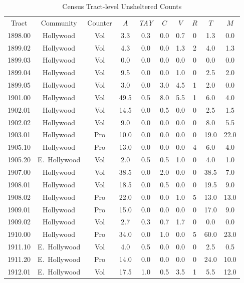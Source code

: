 \documentclass[11pt,twocolumn]{article}
\begin{document}
\begin{table}[]
\caption{Census Tract-level Unsheltered Counts}
\centering
\begin{tabular}{cccccccccc}
\toprule
Tract & Community & Counter & $A$ & {\it TAY} & $C$ & $V$ & $R$ & $T$ & $M$ \\ \cmidrule{1-10}
1898.00 & Hollywood & Vol &  3.3 &  0.3 &  0.0 &  0.7 & 0 &  1.3 &  0.0 \\
1899.02 & Hollywood & Vol &  4.3 &  0.0 &  0.0 &  1.3 & 2 &  4.0 &  1.3 \\
1899.03 & Hollywood & Vol &  0.0 &  0.0 &  0.0 &  0.0 & 0 &  0.0 &  0.0 \\
1899.04 & Hollywood & Vol &  9.5 &  0.0 &  0.0 &  1.0 & 0 &  2.5 &  2.0 \\
1899.05 & Hollywood & Vol &  3.0 &  0.0 &  3.0 &  4.5 & 1 &  2.0 &  0.0 \\
1901.00 & Hollywood & Vol & 49.5 &  0.5 &  8.0 &  5.5 & 1 &  6.0 &  4.0 \\
1902.01 & Hollywood & Vol & 14.5 &  0.0 &  0.5 &  0.0 & 0 &  2.5 &  1.5 \\
1902.02 & Hollywood & Vol &  9.0 &  0.0 &  0.0 &  0.0 & 0 &  8.0 &  5.5 \\
1903.01 & Hollywood & Pro & 10.0 &  0.0 &  0.0 &  0.0 & 0 & 19.0 & 22.0 \\
1905.10 & Hollywood & Pro & 13.0 &  0.0 &  0.0 &  0.0 & 4 &  6.0 &  4.0 \\
1905.20 & E.~Hollywood & Vol &  2.0 &  0.5 &  0.5 &  1.0 & 0 &  4.0 &  1.0 \\
1907.00 & Hollywood & Vol & 38.5 &  0.0 &  2.0 &  0.0 & 0 & 38.5 &  7.0 \\
1908.01 & Hollywood & Vol & 18.5 &  0.0 &  0.5 &  0.0 & 0 & 19.5 &  9.0 \\
1908.02 & Hollywood & Pro & 22.0 &  0.0 &  0.0 &  1.0 & 5 & 13.0 & 13.0 \\
1909.01 & Hollywood & Pro & 15.0 &  0.0 &  0.0 &  0.0 & 0 & 17.0 &  9.0 \\
1909.02 & Hollywood & Vol &  2.7 &  0.3 &  0.7 &  1.7 & 0 &  0.0 &  0.0 \\
1910.00 & Hollywood & Pro & 34.0 &  0.0 &  1.0 &  0.0 & 5 & 60.0 & 23.0 \\
1911.10 & E.~Hollywood & Vol &  4.0 &  0.5 &  0.0 &  0.0 & 0 &  2.5 &  0.5 \\
1911.20 & E.~Hollywood & Pro & 14.0 &  0.0 &  0.0 &  0.0 & 0 & 24.0 & 10.0 \\
1912.01 & E.~Hollywood & Vol & 17.5 &  1.0 &  0.5 &  3.5 & 1 &  5.5 & 12.0 \\

\end{tabular}
\end{table}
\end{document}
